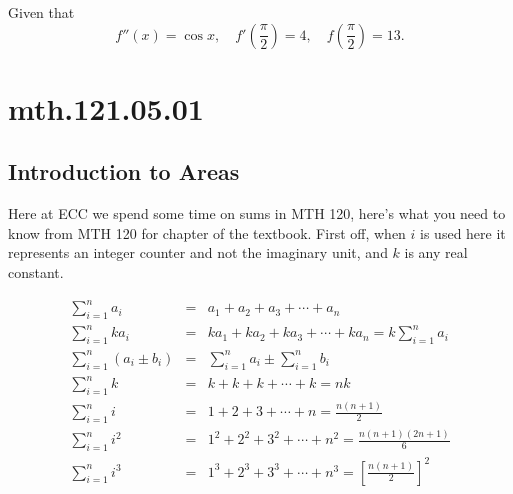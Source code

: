 \documentclass[12pt,addpoints, answers, fleqn]{exam}
\begin{document}
\begin{teacher}
\begin{questions}
\question 	%

Given that
\[
f''\left( x \right) = \cos x, \quad f'\left( \frac{\pi}{2} \right) =4, \quad f\left( \frac{\pi}{2} \right) =13.
\]
\end{questions}
\end{teacher}
\vfill
\pagebreak

\section{mth.121.05.01}
\subsection{Introduction to Areas}

Here at ECC we spend some time on sums in MTH 120, here's what you need to know from MTH 120 for chapter of the textbook. First off, when $i$ is used here it represents an integer counter and not the imaginary unit, and $k$ is any real constant.

\begin{eqnarray}
\sum\limits_{i = 1}^n {a_i}  &=& a_1 + a_2 + a_3 + \cdots + a_n\\[10pt]
\sum\limits_{i = 1}^n {ka_i}  &=& ka_1 + ka_2 + ka_3 + \cdots + ka_n = k\sum\limits_{i = 1}^n {a_i}\\[10pt]
\sum\limits_{i = 1}^n \left({a_i \pm b_i}\right)  &=& \sum\limits_{i = 1}^n {a_i} \pm \sum\limits_{i = 1}^n {b_i}\\[10pt]
\sum\limits_{i = 1}^n {k}  &=& k + k + k + \cdots + k = nk \\[10pt]
\sum\limits_{i = 1}^n {i}  &=& 1 + 2 + 3 + \cdots + n = \displaystyle \frac{n\left(n+1\right)}{2} \\[10pt]
\sum\limits_{i = 1}^n {i^2}  &=& 1^2 + 2^2 + 3^2 + \cdots + n^2 = \displaystyle \frac{n\left(n+1\right)\left(2n+1\right)}{6} \\[10pt]
\sum\limits_{i = 1}^n {i^3}  &=& 1^3 + 2^3 + 3^3 + \cdots + n^3 = \displaystyle \left[\frac{n\left(n+1\right)}{2} \right]^2
\end{eqnarray}
\end{document}
